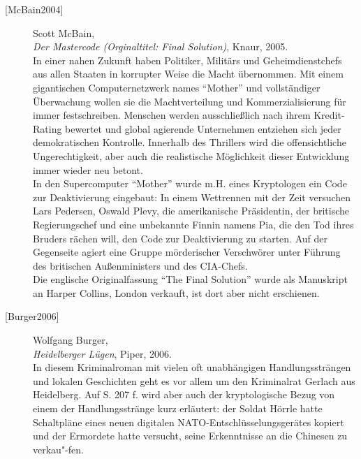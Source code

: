 \begin{description}
\item[\textrm{[McBain2004]}] 
    Scott McBain, \\
    {\em Der Mastercode (Orginaltitel: Final Solution)}, Knaur, 2005. \\
    In einer nahen Zukunft haben Politiker, Militärs und Geheimdienstchefs
    aus allen Staaten in korrupter Weise die Macht übernommen. Mit einem
    gigantischen Computernetzwerk names "`Mother"' und vollständiger
    Überwachung wollen sie die Machtverteilung und Kommerzialisierung für
    immer festschreiben.
    Menschen werden ausschließlich nach ihrem Kredit-Rating bewertet und
    global agierende Unternehmen entziehen sich jeder demokratischen
    Kontrolle.
    Innerhalb des Thrillers wird die offensichtliche Ungerechtigkeit,
    aber auch die realistische Möglichkeit dieser Entwicklung immer wieder
    neu betont.\\
    In den Supercomputer "`Mother"' wurde m.H. eines Kryptologen ein Code zur
    Deaktivierung eingebaut: In einem Wettrennen mit der Zeit versuchen
    Lars Pedersen, Oswald Plevy, die amerikanische Präsidentin, der britische
    Regierungschef und eine unbekannte Finnin namens Pia, die den Tod ihres
    Bruders rächen will, den Code zur Deaktivierung zu starten. Auf der
    Gegenseite agiert eine Gruppe mörderischer Verschwörer unter Führung
    des britischen Außenministers und des CIA-Chefs.\\
    Die englische Originalfassung "`The Final Solution"' wurde als Manuskript
    an Harper Collins, London verkauft, ist dort aber nicht erschienen.\\

	
\item[\textrm{[Burger2006]}] 
    Wolfgang Burger, \\
    {\em Heidelberger Lügen}, Piper, 2006. \\
    In diesem Kriminalroman mit vielen oft
    unabhängigen Handlungssträngen und lokalen Geschichten geht es vor
    allem um den Kriminalrat Gerlach aus Heidelberg. Auf S. 207 f. wird aber
    auch der kryptologische Bezug von einem der Handlungsstränge kurz
    erläutert: der Soldat Hörrle hatte Schaltpläne eines neuen digitalen
    NATO-Entschlüsselungsgerätes kopiert und der Ermordete hatte versucht,
    seine Erkenntnisse an die Chinesen zu verkau"-fen.\\



\end{description}
